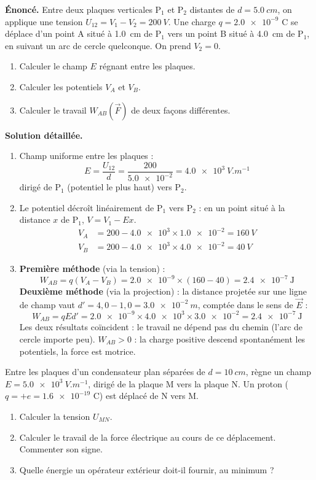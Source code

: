 \documentclass[11pt]{article}
\begin{document}
\begin{exoresolu}
\textbf{Énoncé.} Entre deux plaques verticales P$_1$ et P$_2$ distantes de $d = \SI{5,0}{cm}$, on applique une tension $U_{12} = V_1 - V_2 = \SI{200}{V}$. Une charge $q = \num{+2,0e-9}$ C se déplace d'un point A situé à \SI{1,0}{cm} de P$_1$ vers un point B situé à \SI{4,0}{cm} de P$_1$, en suivant un arc de cercle quelconque. On prend $V_2 = 0$.
\begin{enumerate}
\item Calculer le champ $E$ régnant entre les plaques.
\item Calculer les potentiels $V_A$ et $V_B$.
\item Calculer le travail $W_{AB}(\vec{F})$ de deux façons différentes.
\end{enumerate}
\tcblower
\textbf{Solution détaillée.}
\begin{enumerate}
\item Champ uniforme entre les plaques :
\[ E = \frac{U_{12}}{d} = \frac{200}{\num{5,0e-2}} = \SI{4,0e3}{V.m^{-1}} \]
dirigé de P$_1$ (potentiel le plus haut) vers P$_2$.
\item Le potentiel décroît linéairement de P$_1$ vers P$_2$ : en un point situé à la distance $x$ de P$_1$, $V = V_1 - Ex$.
\begin{align*}
V_A &= 200 - \num{4,0e3}\times\num{1,0e-2} = \SI{160}{V} \\
V_B &= 200 - \num{4,0e3}\times\num{4,0e-2} = \SI{40}{V}
\end{align*}
\item \textbf{Première méthode} (via la tension) :
\[ W_{AB} = q(V_A - V_B) = \num{2,0e-9}\times(160-40) = \num{+2,4e-7}\ \text{J} \]
\textbf{Deuxième méthode} (via la projection) : la distance projetée sur une ligne de champ vaut $d' = 4,0 - 1,0 = \SI{3,0e-2}{m}$, comptée dans le sens de $\vec{E}$ :
\[ W_{AB} = qEd' = \num{2,0e-9}\times\num{4,0e3}\times\num{3,0e-2} = \num{+2,4e-7}\ \text{J} \]
Les deux résultats coïncident : le travail ne dépend pas du chemin (l'arc de cercle importe peu). $W_{AB} > 0$ : la charge positive descend spontanément les potentiels, la force est motrice.
\end{enumerate}
\end{exoresolu}

\begin{exercice}
Entre les plaques d'un condensateur plan séparées de $d = \SI{10}{cm}$, règne un champ $E = \SI{5,0e3}{V.m^{-1}}$, dirigé de la plaque M vers la plaque N. Un proton ($q = +e = \num{1,6e-19}$ C) est déplacé de N vers M.
\begin{enumerate}
\item Calculer la tension $U_{MN}$.
\item Calculer le travail de la force électrique au cours de ce déplacement. Commenter son signe.
\item Quelle énergie un opérateur extérieur doit-il fournir, au minimum ?
\end{enumerate}
\end{exercice}
\end{document}
